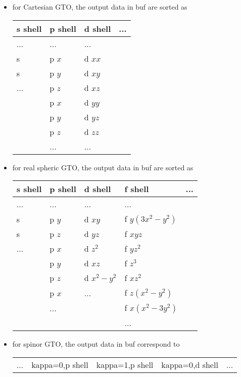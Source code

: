 \documentclass{article}
\begin{document}
\begin{itemize}
\item
  for Cartesian GTO, the output data in buf are sorted
  as\\\begin{tabular}{l|l|l|l}
\hline
    s shell & p shell & d shell & ... \\
\hline
    ...     & ...     & ...     & \\
    s       & p $x$   & d $xx$  & \\
    s       & p $y$   & d $xy$  & \\
    ...     & p $z$   & d $xz$  & \\
            & p $x$   & d $yy$  & \\
            & p $y$   & d $yz$  & \\
            & p $z$   & d $zz$  & \\
            & ...     & ...     & \\
\hline
\end{tabular}
\item
  for real spheric GTO, the output data in buf are sorted
  as\\\begin{tabular}{l|l|l|l|l}
\hline
    s shell & p shell & d shell     & f shell         & ... \\
\hline
    ...     & ...     & ...         & ...             & \\
    s       & p $y$   & d $xy     $ & f $y(3x^2-y^2)$ & \\
    s       & p $z$   & d $yz     $ & f $xyz        $ & \\
    ...     & p $x$   & d $z^2    $ & f $yz^2       $ & \\
            & p $y$   & d $xz     $ & f $z^3        $ & \\
            & p $z$   & d $x^2-y^2$ & f $xz^2       $ & \\
            & p $x$   & ...         & f $z(x^2-y^2) $ & \\
            & ...     &             & f $x(x^2-3y^2)$ & \\
            &         &             & ...             & \\
\hline
\end{tabular}
\item
  for spinor GTO, the output data in buf correspond
  to\\\begin{tabular}{l|l|l|l|l}
\hline
    ... & kappa=0,p shell & kappa=1,p shell & kappa=0,d shell & ... \\

\end{tabular}
\end{itemize}
\end{document}
